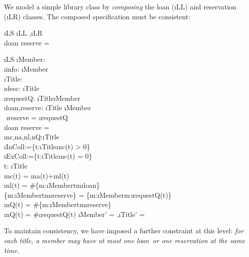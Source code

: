 \documentclass[12pt,a4paper]{article}
\begin{document}
We model a simple library class by \emph{composing} the loan (\i{LL}) and
reservation (\i{LR}) classes. The composed specification must be consistent:
\begin{showspecs}
	\begin{spec}{\i{LS}}
		\i{LL} \sep	\i{LR}\\[0.25ex]
		\i{loan \cap reserve} = \emptyset
	\end{spec}
\end{showspecs}
\begin{showspecs}
	\begin{spec}[\equiv]{\i{LS}}
		\i{Member}: \;\\
		\i{info}: \i{Member} \tfun {}\\[0.5ex]
		\i{Title}: \;\\
		\i{desc}: \i{Title} \tfun {}\\[0.5ex]
		\i{requestQ}: \i{Title}\tfun{}\cdot{}\;\i{Member}\\[0.5ex]
		\i{loan,reserve}: \i{Title} \prel \i{Member}\\
		\,\,\i{reserve} = \circ\i{requestQ}\\
		\i{loan \cap reserve} = \emptyset\\[0.5ex]
		\i{nc,na,nl,nQ}\!:\!\i{Title}\!\tfun{}\\
		\i{InColl}:=\!\{t\!:\!\i{Title}\bullet\i{nc}(t) > 0\}\\
		\i{ExColl}\!:=\!\{t\!:\!\i{Title}\bullet\i{nc}(t) = 0\}\\
        \forall t: \i{Title}\, \bullet \\
        \hspace{0.5cm}\i{nc}(t) = \i{na}(t)+\i{nl}(t) \,\wedge\\
		\hspace{0.5cm}\i{nl}(t) = \#\{m:\i{Member}\bullet t\mapsto m\in \i{loan}\} \,\wedge\\
        \hspace{0.5cm}\{m:\i{Member}\bullet t\mapsto m\in \i{reserve}\} = \{m:\i{Member}\bullet m\in {}\,\i{requestQ}(t)\}\,\wedge\\
		\hspace{0.5cm}\i{nQ}(t) = \#\{m:\i{Member}\bullet t\mapsto m\in \i{reserve}\}\,\wedge\\
        \hspace{0.5cm}\i{nQ}(t) = \#\i{requestQ}(t)
	\post	\i{Member'} = \emptyset \sep \i{Title'} = \emptyset
	\end{spec}
\end{showspecs}
%
\medskip\noindent To maintain consistency, we have imposed a further constraint at this level:
\emph{for each title, a member may have at most one loan \emph{\,or} one reservation at the same time.}
\end{document}
